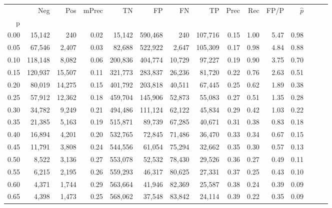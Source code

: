 \begin{tabular}{rrrrrrrrrrrrrrr}
\toprule
{} &      Neg &     Pos & mPrec &       TN &       FP &       FN &       TP &  Prec &   Rec &  FP/P & $\hat{p}$ \\
p    &          &         &       &          &          &          &          &       &       &       &           \\
\midrule
0.00 &   15,142 &     240 &  0.02 &   15,142 &  590,468 &      240 &  107,716 &  0.15 &  1.00 &  5.47 &      0.98 \\
0.05 &   67,546 &   2,407 &  0.03 &   82,688 &  522,922 &    2,647 &  105,309 &  0.17 &  0.98 &  4.84 &      0.88 \\
0.10 &  118,148 &   8,082 &  0.06 &  200,836 &  404,774 &   10,729 &   97,227 &  0.19 &  0.90 &  3.75 &      0.70 \\
0.15 &  120,937 &  15,507 &  0.11 &  321,773 &  283,837 &   26,236 &   81,720 &  0.22 &  0.76 &  2.63 &      0.51 \\
0.20 &   80,019 &  14,275 &  0.15 &  401,792 &  203,818 &   40,511 &   67,445 &  0.25 &  0.62 &  1.89 &      0.38 \\
0.25 &   57,912 &  12,362 &  0.18 &  459,704 &  145,906 &   52,873 &   55,083 &  0.27 &  0.51 &  1.35 &      0.28 \\
0.30 &   34,782 &   9,249 &  0.21 &  494,486 &  111,124 &   62,122 &   45,834 &  0.29 &  0.42 &  1.03 &      0.22 \\
0.35 &   21,385 &   5,163 &  0.19 &  515,871 &   89,739 &   67,285 &   40,671 &  0.31 &  0.38 &  0.83 &      0.18 \\
0.40 &   16,894 &   4,201 &  0.20 &  532,765 &   72,845 &   71,486 &   36,470 &  0.33 &  0.34 &  0.67 &      0.15 \\
0.45 &   11,791 &   3,808 &  0.24 &  544,556 &   61,054 &   75,294 &   32,662 &  0.35 &  0.30 &  0.57 &      0.13 \\
0.50 &    8,522 &   3,136 &  0.27 &  553,078 &   52,532 &   78,430 &   29,526 &  0.36 &  0.27 &  0.49 &      0.11 \\
0.55 &    6,215 &   2,195 &  0.26 &  559,293 &   46,317 &   80,625 &   27,331 &  0.37 &  0.25 &  0.43 &      0.10 \\
0.60 &    4,371 &   1,744 &  0.29 &  563,664 &   41,946 &   82,369 &   25,587 &  0.38 &  0.24 &  0.39 &      0.09 \\
0.65 &    4,398 &   1,473 &  0.25 &  568,062 &   37,548 &   83,842 &   24,114 &  0.39 &  0.22 &  0.35 &      0.09 \\

\end{tabular}
